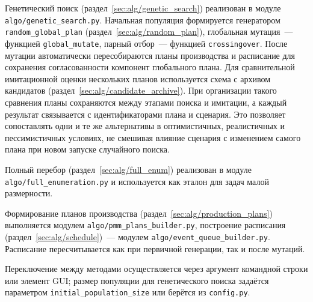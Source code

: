 Генетический поиск (раздел~\ref{sec:alg/genetic_search}) реализован в модуле \texttt{algo/genetic\_search.py}.
Начальная популяция формируется генератором \texttt{random\_global\_plan} (раздел~\ref{sec:alg/random_plan}), глобальная мутация~--- функцией \texttt{global\_mutate}, парный отбор~--- функцией \texttt{crossingover}.
После мутации автоматически пересобираются планы производства и расписание для сохранения согласованности компонент глобального плана.
Для сравнительной имитационной оценки нескольких планов используется схема с архивом кандидатов (раздел~\ref{sec:alg/candidate_archive}). При организации такого сравнения планы сохраняются между этапами поиска и имитации, а каждый результат связывается с идентификаторами плана и сценария. Это позволяет сопоставлять одни и те же альтернативы в оптимистичных, реалистичных и пессимистичных условиях, не смешивая влияние сценария с изменением самого плана при новом запуске случайного поиска.

Полный перебор (раздел~\ref{sec:alg/full_enum}) реализован в модуле \texttt{algo/full\_enumeration.py} и используется как эталон для задач малой размерности.

Формирование планов производства (раздел~\ref{sec:alg/production_plans}) выполняется модулем \texttt{algo/pmm\_plans\_builder.py}, построение расписания (раздел~\ref{sec:alg/schedule})~--- модулем \texttt{algo/event\_queue\_builder.py}.
Расписание пересчитывается как при первичной генерации, так и после мутаций.

Переключение между методами осуществляется через аргумент командной строки или элемент GUI; размер популяции для генетического поиска задаётся параметром \texttt{initial\_population\_size} или берётся из \texttt{config.py}.

